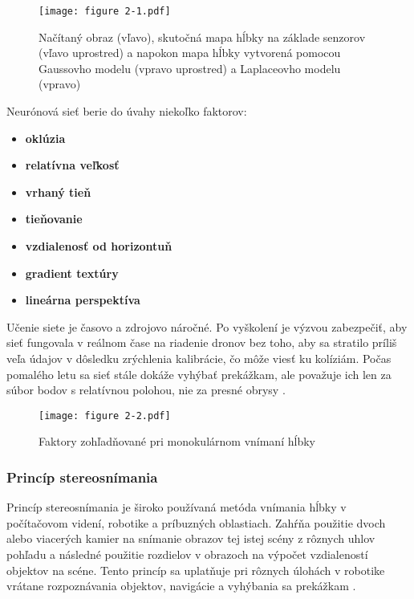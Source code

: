 \begin{figure}[ht!]
    \centering
    \texttt{[image: figure 2-1.pdf]}
    \caption{Načítaný obraz (vľavo), skutočná mapa hĺbky na základe senzorov (vľavo uprostred) a napokon mapa hĺbky vytvorená pomocou Gaussovho modelu (vpravo uprostred) a Laplaceovho modelu (vpravo)}
    \label{o:2-1}
\end{figure}

Neurónová sieť berie do úvahy niekoľko faktorov:
\begin{itemize}
    \item \textbf{oklúzia}
    \item \textbf{relatívna veľkosť}
    \item \textbf{vrhaný tieň}
    \item \textbf{tieňovanie}
    \item \textbf{vzdialenosť od horizontuň}
    \item \textbf{gradient textúry}
    \item \textbf{lineárna perspektíva}
\end{itemize}
Učenie siete je časovo a zdrojovo náročné. Po vyškolení je výzvou zabezpečiť, aby sieť fungovala v reálnom čase na riadenie dronov bez toho, aby sa stratilo príliš veľa údajov v dôsledku zrýchlenia kalibrácie, čo môže viesť ku kolíziám. Počas pomalého letu sa sieť stále dokáže vyhýbať prekážkam, ale považuje ich len za súbor bodov s relatívnou polohou, nie za presné obrysy \citep{aabed2012depth}.

\begin{figure}[ht!]
    \centering
    \texttt{[image: figure 2-2.pdf]}
    \caption{Faktory zohľadňované pri monokulárnom vnímaní hĺbky}
    \label{o:2-2}
\end{figure}

\subsubsection{Princíp stereosnímania}
Princíp stereosnímania je široko používaná metóda vnímania hĺbky v počítačovom videní, robotike a príbuzných oblastiach. Zahŕňa použitie dvoch alebo viacerých kamier na snímanie obrazov tej istej scény z rôznych uhlov pohľadu a následné použitie rozdielov v obrazoch na výpočet vzdialeností objektov na scéne. Tento princíp sa uplatňuje pri rôznych úlohách v robotike vrátane rozpoznávania objektov, navigácie a vyhýbania sa prekážkam \citep{brzozowski2018stereo}.

